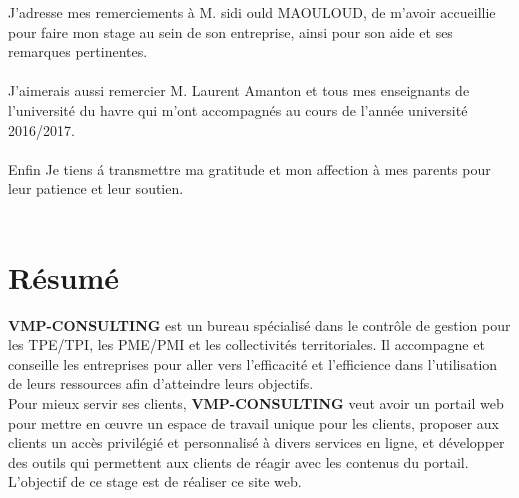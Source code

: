 \documentclass[12pt]{article}
\begin{document}
J’adresse mes remerciements à  M. sidi ould MAOULOUD, de m’avoir accueillie pour faire mon
stage au sein de son entreprise, ainsi pour son aide et  ses  remarques pertinentes.  \\ \\
J’aimerais aussi remercier M. Laurent Amanton  et tous mes enseignants de l’université du havre
qui m’ont accompagnés 
au cours de l'année université 2016/2017.\\ \\

Enfin  Je tiens á transmettre ma gratitude et mon affection à mes
parents  pour leur patience et leur soutien.\\ \\


\newpage

\section*{Résumé}
\textbf{VMP-CONSULTING}  est un bureau spécialisé dans le contrôle de gestion pour les TPE/TPI, les PME/PMI et les collectivités territoriales. Il  accompagne et conseille les entreprises pour aller vers l'efficacité et l'efficience dans l'utilisation de leurs ressources afin d'atteindre leurs objectifs.\\
Pour mieux servir ses clients, \textbf{VMP-CONSULTING}  veut avoir un portail web pour 
mettre en œuvre un espace de travail unique pour les clients, 
 proposer aux clients un accès privilégié et personnalisé à divers services en
ligne, et 
développer des outils qui permettent aux clients de réagir avec les contenus du
portail.\\
L'objectif de ce stage est de réaliser ce site web.
\end{document}
